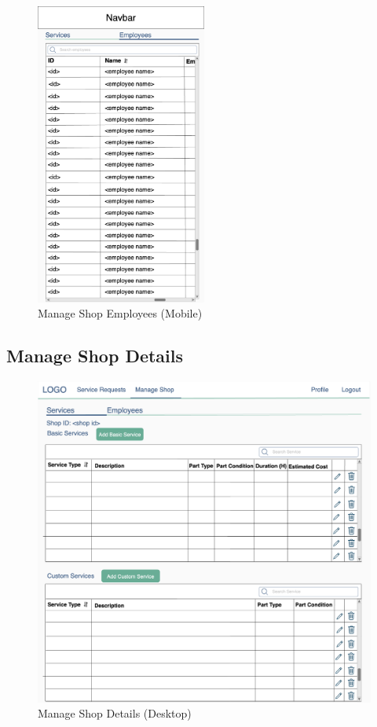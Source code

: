 \documentclass[12pt, titlepage]{article}
\begin{document}
\begin{figure}[H]
	\centering
	\includegraphics[width=0.5\textwidth]{mockups/Manage Shop (Employees) (Mobile).png}
	\caption{Manage Shop \textemdash{} Employees (Mobile)}
\end{figure}

\subsection{Manage Shop Details}

\begin{figure}[H]
	\centering
	\includegraphics[width=\textwidth]{mockups/Manage Shop (Shop Settings) (Desktop).png}
	\caption{Manage Shop \textemdash{} Details (Desktop)}
\end{figure}
\end{document}
